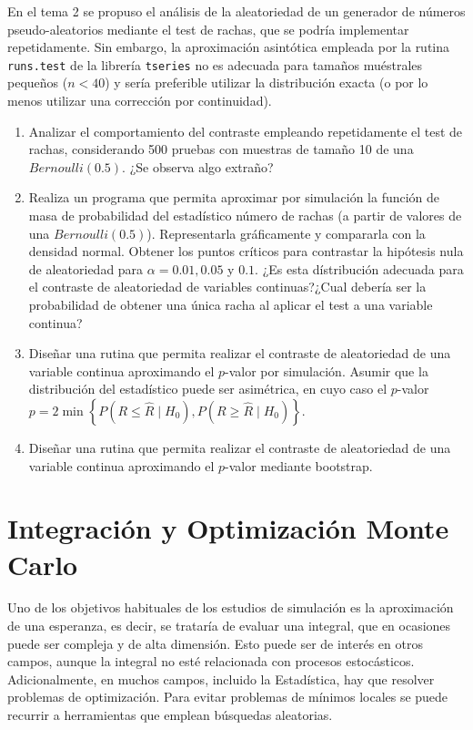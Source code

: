 \documentclass[
]{book}
\theoremstyle{break}
\theoremstyle{definition}
\theoremstyle{definition}
\theoremstyle{definition}
\theoremstyle{remark}
\begin{document}
En el tema 2 se propuso el análisis de la aleatoriedad de un
generador de números pseudo-aleatorios mediante el test de rachas,
que se podría implementar repetidamente. Sin embargo, la
aproximación asintótica empleada por la rutina \texttt{runs.test} de la
librería \texttt{tseries} no es adecuada para tamaños muéstrales pequeños
(\(n<40\)) y sería preferible utilizar la distribución exacta (o
por lo menos utilizar una corrección por continuidad).

\begin{enumerate}
\def\labelenumi{\alph{enumi})}
\item
  Analizar el comportamiento del contraste empleando repetidamente
  el test de rachas, considerando 500 pruebas con muestras de
  tamaño 10 de una \(Bernoulli(0.5)\). ¿Se observa algo extraño?
\item
  Realiza un programa que permita aproximar por simulación la
  función de masa de probabilidad del estadístico número de rachas
  (a partir de valores de una \(Bernoulli(0.5)\)). Representarla
  gráficamente y compararla con la densidad normal. Obtener los
  puntos críticos para contrastar la hipótesis nula de
  aleatoriedad para \(\alpha=0.01,0.05\) y \(0.1\). ¿Es esta
  dístribución adecuada para el contraste de aleatoriedad de
  variables continuas?¿Cual debería ser la probabilidad de obtener
  una única racha al aplicar el test a una variable continua?
\item
  Diseñar una rutina que permita realizar el contraste de
  aleatoriedad de una variable continua aproximando el \(p\)-valor
  por simulación. Asumir que la distribución del estadístico puede
  ser asimétrica, en cuyo caso el \(p\)-valor
  \(p=2\min\left\{ P\left( R\leq\hat{R}\mid H_{0}\right) , P\left( R\geq \hat{R}\mid H_{0}\right) \right\}\).
\item
  Diseñar una rutina que permita realizar el contraste de
  aleatoriedad de una variable continua aproximando el \(p\)-valor
  mediante bootstrap.
\end{enumerate}

\hypertarget{cap9}{%
\chapter{Integración y Optimización Monte Carlo}\label{cap9}}

Uno de los objetivos habituales de los estudios de simulación es la aproximación de una esperanza, es decir, se trataría de evaluar una integral, que en ocasiones puede ser compleja y de alta dimensión. Esto puede ser de interés en otros campos, aunque la integral no esté relacionada con procesos estocásticos.
Adicionalmente, en muchos campos, incluido la Estadística, hay que resolver problemas de optimización. Para evitar problemas de mínimos locales se puede recurrir a herramientas que emplean búsquedas aleatorias.
\end{document}
